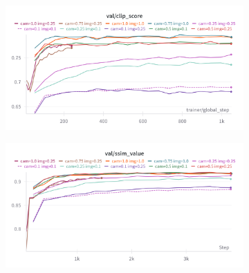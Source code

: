 \begin{figure}[htbp]
  \centering
  \begin{subfigure}[b]{0.48\textwidth}
    \centering
    \includegraphics[width=\textwidth]{images/experiments/cam_img/clip_score.png}
    \label{fig:exp_cond_clip}
  \end{subfigure}
  \hfill
  \begin{subfigure}[b]{0.48\textwidth}
    \centering
    \includegraphics[width=\textwidth]{images/experiments/cam_img/ssim.png}
    \label{fig:exp_cond_ssim}
  \end{subfigure}


\end{figure}
